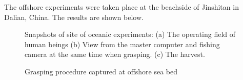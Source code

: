 The offshore experiments were taken place at the beachside of Jinshitan in
Dalian, China. The results are shown below.

\begin{figure}[htb]
    \caption[Snapshots of site of oceanic experiments]{Snapshots of site of
    oceanic experiments: (a) The operating field of human beings (b) View from
    the master computer and fishing camera at the same time when grasping. (c)
    The harvest.}\label{f:site}
\end{figure}

\begin{figure}
    \caption[Grasping Procedure Captured at Offshore Sea Bed]{Grasping procedure
        captured at offshore sea bed}\label{f:ocean}
\end{figure}